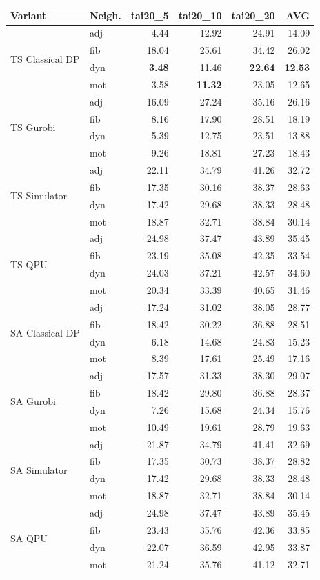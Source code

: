 \setlength{\tabcolsep}{3pt}
\begin{tabular}{@{}ll rrrr@{}}
\textbf{Variant} & \textbf{Neigh.} & tai20\_5 & tai20\_10 & tai20\_20 & \textbf{AVG} \\
\hline
\multirow{4}{*}{TS Classical DP} & adj & 4.44 & 12.92 & 24.91 & 14.09 \\
 & fib & 18.04 & 25.61 & 34.42 & 26.02 \\
 & dyn & {\bfseries 3.48} & 11.46 & {\bfseries 22.64} & {\bfseries 12.53} \\
 & mot & 3.58 & {\bfseries 11.32} & 23.05 & 12.65 \\
\hline
\multirow{4}{*}{TS Gurobi} & adj & 16.09 & 27.24 & 35.16 & 26.16 \\
 & fib & 8.16 & 17.90 & 28.51 & 18.19 \\
 & dyn & 5.39 & 12.75 & 23.51 & 13.88 \\
 & mot & 9.26 & 18.81 & 27.23 & 18.43 \\
\hline
\multirow{4}{*}{TS Simulator} & adj & 22.11 & 34.79 & 41.26 & 32.72 \\
 & fib & 17.35 & 30.16 & 38.37 & 28.63 \\
 & dyn & 17.42 & 29.68 & 38.33 & 28.48 \\
 & mot & 18.87 & 32.71 & 38.84 & 30.14 \\
\hline
\multirow{4}{*}{TS QPU} & adj & 24.98 & 37.47 & 43.89 & 35.45 \\
 & fib & 23.19 & 35.08 & 42.35 & 33.54 \\
 & dyn & 24.03 & 37.21 & 42.57 & 34.60 \\
 & mot & 20.34 & 33.39 & 40.65 & 31.46 \\
\hline
\multirow{4}{*}{SA Classical DP} & adj & 17.24 & 31.02 & 38.05 & 28.77 \\
 & fib & 18.42 & 30.22 & 36.88 & 28.51 \\
 & dyn & 6.18 & 14.68 & 24.83 & 15.23 \\
 & mot & 8.39 & 17.61 & 25.49 & 17.16 \\
\hline
\multirow{4}{*}{SA Gurobi} & adj & 17.57 & 31.33 & 38.30 & 29.07 \\
 & fib & 18.42 & 29.80 & 36.88 & 28.37 \\
 & dyn & 7.26 & 15.68 & 24.34 & 15.76 \\
 & mot & 10.49 & 19.61 & 28.79 & 19.63 \\
\hline
\multirow{4}{*}{SA Simulator} & adj & 21.87 & 34.79 & 41.41 & 32.69 \\
 & fib & 17.35 & 30.73 & 38.37 & 28.82 \\
 & dyn & 17.42 & 29.68 & 38.33 & 28.48 \\
 & mot & 18.87 & 32.71 & 38.84 & 30.14 \\
\hline
\multirow{4}{*}{SA QPU} & adj & 24.98 & 37.47 & 43.89 & 35.45 \\
 & fib & 23.43 & 35.76 & 42.36 & 33.85 \\
 & dyn & 22.07 & 36.59 & 42.95 & 33.87 \\
 & mot & 21.24 & 35.76 & 41.12 & 32.71 \\
\hline
\end{tabular}
